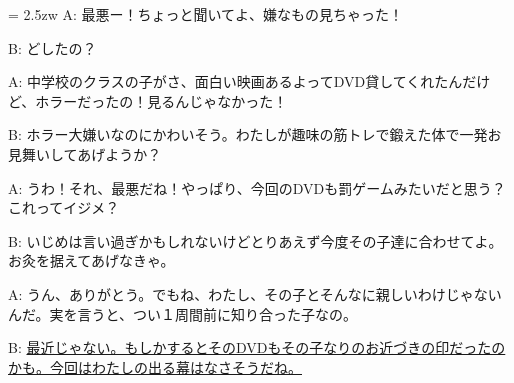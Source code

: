 \documentclass[11pt]{amsart}
\title{}
\author{}
\newenvironment{hangall}[1]{\hangindent = 2.5zw\everypar{\hangindent = 2.5zw}}{}
\begin{document}
\maketitle
\begin{hangall}{}%
A: 最悪ー！ちょっと聞いてよ、嫌なもの見ちゃった！

B: どしたの？

A: 中学校のクラスの子がさ、面白い映画あるよってDVD貸してくれたんだけど、ホラーだったの！見るんじゃなかった！

B: ホラー大嫌いなのにかわいそう。わたしが趣味の筋トレで鍛えた体で一発お見舞いしてあげようか？

A: うわ！それ、最悪だね！やっぱり、今回のDVDも罰ゲームみたいだと思う？これってイジメ？

B: いじめは言い過ぎかもしれないけどとりあえず今度その子達に合わせてよ。お灸を据えてあげなきゃ。

A: うん、ありがとう。でもね、わたし、その子とそんなに親しいわけじゃないんだ。実を言うと、つい１周間前に知り合った子なの。

B: \ul{最近じゃない。もしかするとそのDVDもその子なりのお近づきの印だったのかも。今回はわたしの出る幕はなさそうだね。}\end{hangall}
\end{document}

